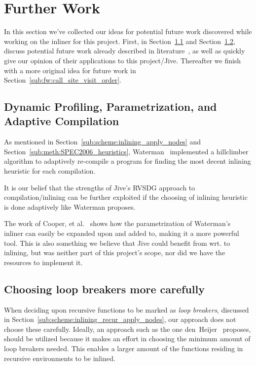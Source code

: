 
\clearpage
\section{Further Work}
\label{sec:further_work}

In this section we've collected our ideas for potential future work discovered
while working on the inliner for this project. First, in
Section~\ref{sub:fw:adaptiv_comp} and
Section~\ref{sub:fw:optimal_loop_breakers}, discuss potential future work
already described in
literature~\cite{AdaptvStratInlSubst,AdaptvCompilAndInlingWaterman,BasMscThesis}, as well as quickly give our opinion of their applications
to this project/Jive. Thereafter we finish with a more original idea for future
work in Section~\ref{sub:fw:call_site_visit_order}.

\subsection{Dynamic Profiling, Parametrization, and Adaptive Compilation}
\label{sub:fw:adaptiv_comp}

As mentioned in Section~\ref{sub:scheme:inlining_apply_nodes} and
Section~\ref{sub:meth:SPEC2006_heuristics},
Waterman~\cite{AdaptvCompilAndInlingWaterman} implemented a hillclimber
algorithm to adaptively re-compile a program for finding the most decent
inlining heuristic for each compilation.

It is our belief that the strengths of Jive's RVSDG approach to
compilation/inlining can be further exploited if the choosing of inlining
heuristic is done adaptively like Waterman proposes.

The work of Cooper, et al.~\cite{AdaptvStratInlSubst} shows how the
parametrization of Waterman's~\cite{AdaptvCompilAndInlingWaterman} inliner can
easily be expanded upon and added to, making it a more powerful tool. This is
also something we believe that Jive could benefit from wrt. to inlining, but was
neither part of this project's scope, nor did we have the resources to implement
it.

\subsection{Choosing loop breakers more carefully}
\label{sub:fw:optimal_loop_breakers}

When deciding upon recursive functions to be marked as \textit{loop breakers},
discussed in Section~\ref{sub:scheme:inlining_recur_apply_nodes}, our approach
does not choose these carefully. Ideally, an approach such as the one
den~Heijer~\cite{BasMscThesis} proposes, should be utilized because it makes an
effort in choosing the minimum amount of loop breakers needed. This enables a
larger amount of the functions residing in recursive environments to be inlined.

